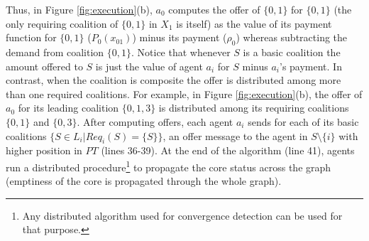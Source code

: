 \documentclass[11pt, twoside, titlepage, a4paper, openright]{report}
\begin{document}
\noindent Thus, in Figure \ref{fig:execution}(b), $a_0$ computes the offer of $\{0,1\}$
for $\{0,1\}$ (the only requiring coalition of $\{0,1\}$ in $X_1$ is
itself) as the value of its payment function for $\{0,1\}$ ($P_0(x_{01})$)
minus its payment ($\rho_0$) whereas subtracting the demand from coalition
$\{0,1\}$. Notice that whenever $S$ is a basic coalition the amount offered
to $S$ is just the value of agent $a_i$ for $S$ minus $a_i$'s payment.
In contrast, when the coalition is composite the offer is distributed among more
than one required coalitions. For example, in Figure \ref{fig:execution}(b), the
offer of $a_0$ for its leading coalition $\{0,1,3\}$ is distributed among its
requiring coalitions $\{0,1\}$ and $\{0,3\}$.
After computing offers, each agent $a_i$ sends for each of its basic coalitions
$\{S \in L_i \vert Req_i(S)=\{S\}\}$, an offer message to the agent in
$S\setminus\{i\}$ with higher position in $PT$  (lines
36-39).
At the end of the algorithm (line 41), agents run a distributed
procedure\footnote{Any distributed algorithm used for convergence detection can be used for that purpose.} to
propagate the core status across the graph (emptiness of the core is propagated through the whole
graph). 
\end{document}
